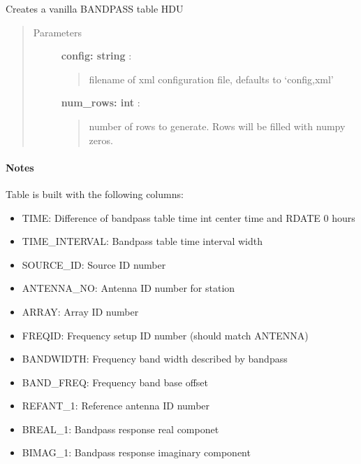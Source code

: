 \documentclass[letterpaper,10pt,english]{sphinxmanual}
\begin{document}

\begin{fulllineitems}
\label{index:pyFitsidi.make_bandpass}
Creates a vanilla BANDPASS table HDU
\begin{quote}\begin{description}
\item[{Parameters }] \leavevmode
\textbf{config: string} :
\begin{quote}

filename of xml configuration file, defaults to `config,xml'
\end{quote}

\textbf{num\_rows: int} :
\begin{quote}

number of rows to generate. Rows will be filled with numpy zeros.
\end{quote}

\end{description}\end{quote}
\paragraph{Notes}

Table is built with the following columns:
\begin{itemize}
\item {} 
TIME: Difference of bandpass table time int center time and RDATE 0 hours

\item {} 
TIME\_INTERVAL: Bandpass table time interval width

\item {} 
SOURCE\_ID:  Source ID number

\item {} 
ANTENNA\_NO: Antenna ID number for station

\item {} 
ARRAY:      Array ID number

\item {} 
FREQID:     Frequency setup ID number (should match ANTENNA)

\item {} 
BANDWIDTH:  Frequency band width described by bandpass

\item {} 
BAND\_FREQ:  Frequency band base offset

\item {} 
REFANT\_1:   Reference antenna ID number

\item {} 
BREAL\_1:    Bandpass response real componet

\item {} 
BIMAG\_1:    Bandpass response imaginary component

\end{itemize}

\end{fulllineitems}
\end{document}
